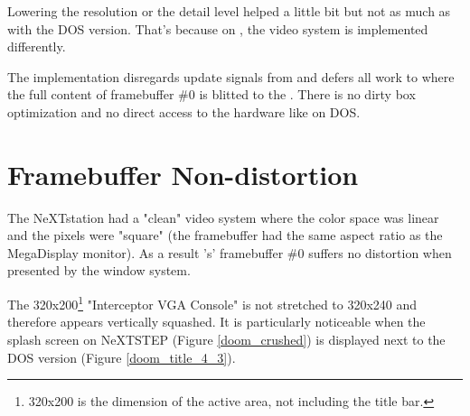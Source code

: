 \par
Lowering the resolution or the detail level helped a little bit but not as much as with the DOS version. That's because on \NeXTns{}, the video system is implemented differently.\\
\par
 The implementation disregards update signals from  and defers all work to  where the full content of framebuffer \#0 is blitted to the . There is no dirty box optimization and no direct access to the hardware like on DOS.\\
\par
{}

\section{Framebuffer Non-distortion}
The NeXTstation had a "clean" video system where the color space was linear and the pixels were "square" (the framebuffer had the same aspect ratio as the MegaDisplay monitor). As a result \doom{}'s' framebuffer \#0 suffers no distortion when presented by the window system.\\
\par
The 320x200\footnote{320x200 is the dimension of the active area, not including the title bar.} "Interceptor VGA Console"  is not stretched to 320x240 and therefore appears vertically squashed. It is particularly noticeable when the splash screen on NeXTSTEP (Figure \ref{doom_crushed}) is displayed next to the DOS version (Figure \ref{doom_title_4_3}).\\
\par
{}
\par
{}
\par
{}
